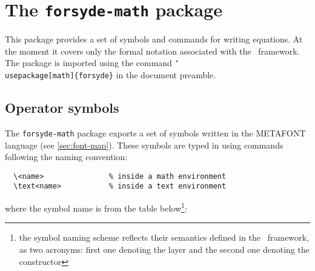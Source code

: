\vfill
\begin{figure}[htb]\centering
  {%
    \setlength{\fboxsep}{7pt}%
    \setlength{\fboxrule}{1pt}%
  }
\end{figure}

\vfill
\newpage

\section{The \texttt{forsyde-math} package}
\label{sec:forsyde-math-package}

This package provides a set of symbols and commands for writing equations. At the moment it covers only the formal notation associated with the \ForSyDeAtom\ framework. The package is imported using the command \texttt{\char`\\usepackage[math]\{forsyde\}} in the document preamble.

\subsection{Operator symbols}
\label{sec:fonts}

The \texttt{forsyde-math} package exports a set of symbols written in the \textsc{METAFONT} language (see \ref{sec:font-map}). These symbols are typed in using commands following the naming convention:

\begin{verbatim}
  \<name>               % inside a math environment
  \text<name>           % inside a text environment
\end{verbatim}

\noindent where the symbol name is from the table below\footnote{the symbol naming scheme reflects their semantics defined in the \ForSyDeAtom\ framework, as two acronyms: first one denoting the layer and the second one denoting the constructor}:

